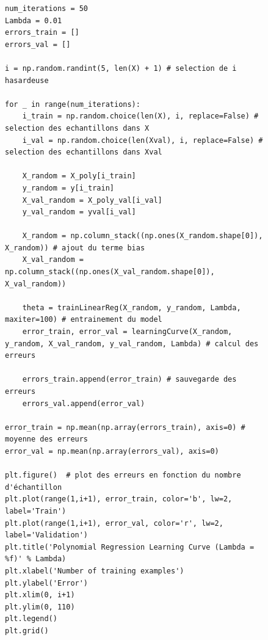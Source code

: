 \begin{figure}[!h]
\begin{verbatim}
num_iterations = 50
Lambda = 0.01
errors_train = []
errors_val = []

i = np.random.randint(5, len(X) + 1) # selection de i hasardeuse

for _ in range(num_iterations):
    i_train = np.random.choice(len(X), i, replace=False) # selection des echantillons dans X
    i_val = np.random.choice(len(Xval), i, replace=False) # selection des echantillons dans Xval
    
    X_random = X_poly[i_train]  
    y_random = y[i_train]
    X_val_random = X_poly_val[i_val] 
    y_val_random = yval[i_val]

    X_random = np.column_stack((np.ones(X_random.shape[0]), X_random)) # ajout du terme bias
    X_val_random = np.column_stack((np.ones(X_val_random.shape[0]), X_val_random))
        
    theta = trainLinearReg(X_random, y_random, Lambda, maxiter=100) # entrainement du model
    error_train, error_val = learningCurve(X_random, y_random, X_val_random, y_val_random, Lambda) # calcul des erreurs

    errors_train.append(error_train) # sauvegarde des erreurs
    errors_val.append(error_val)
    
error_train = np.mean(np.array(errors_train), axis=0) # moyenne des erreurs
error_val = np.mean(np.array(errors_val), axis=0)

plt.figure()  # plot des erreurs en fonction du nombre d'échantillon 
plt.plot(range(1,i+1), error_train, color='b', lw=2, label='Train')
plt.plot(range(1,i+1), error_val, color='r', lw=2, label='Validation')
plt.title('Polynomial Regression Learning Curve (Lambda = %f)' % Lambda)
plt.xlabel('Number of training examples')
plt.ylabel('Error')
plt.xlim(0, i+1)
plt.ylim(0, 110)
plt.legend()
plt.grid()
\end{verbatim}   
\end{figure}


